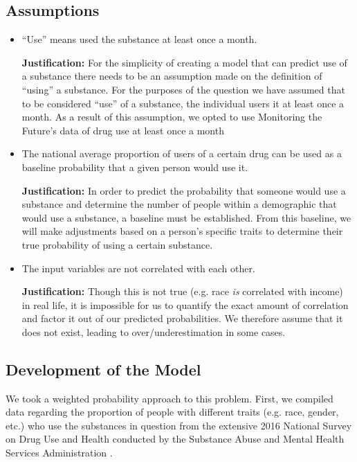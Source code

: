 \documentclass[12pt]{article}
\newcommand{\just}{\textbf{Justification: }}
\begin{document}
\subsection{Assumptions}
\begin{itemize}
    \item “Use” means used the substance at least once a month.
    
    \just For the simplicity of creating a model that can predict use of a substance there needs to be an assumption made on the definition of “using” a substance. For the purposes of the question we have assumed that to be considered “use” of a substance, the individual users it at least once a month. As a result of this assumption, we opted to use Monitoring the Future's data of drug use at least once a month \cite{mtfData}
    
    \item The national average proportion of users of a certain drug can be used as a baseline probability that a given person would use it. 
    
    \just In order to predict the probability that someone would use a substance and determine the number of people within a demographic that would use a substance, a baseline must be established. From this baseline, we will make adjustments based on a person's specific traits to determine their true probability of using a certain substance.
    
    \item The input variables are not correlated with each other.
    
    \just Though this is not true (e.g. race \textit{is} correlated with income) in real life, it is impossible for us to quantify the exact amount of correlation and factor it out of our predicted probabilities. We therefore assume that it does not exist, leading to over/underestimation in some cases.
\end{itemize}

\subsection{Development of the Model}
We took a weighted probability approach to this problem. First, we compiled data regarding the proportion of people with different traits (e.g. race, gender, etc.) who use the substances in question from the extensive 2016 National Survey on Drug Use and Health conducted by the Substance Abuse and Mental Health Services Administration \cite{samhsa}.
\end{document}
